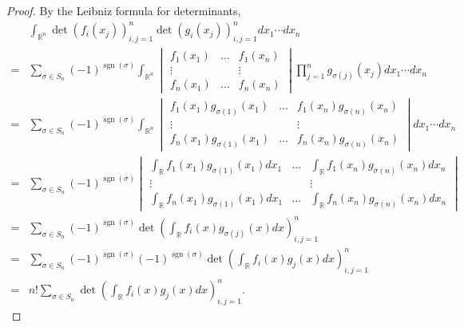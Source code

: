 \documentclass[11pt, a4paper]{article}
\numberwithin{equation}{section}
\newcommand{\realR}{\mathbb{R}}
\DeclareMathOperator{\sgn}{sgn}
\theoremstyle{definition}
\theoremstyle{remark}
\begin{document}
\begin{proof}
  By the Leibniz formula for determinants,
  \begin{equation}
    \begin{split}
      {}& \int_{\realR^n} \det(f_i(x_j))^n_{i, j = 1} \det(g_i(x_j))^n_{i, j = 1} dx_1 \dotsm dx_n \\
      = {}& \sum_{\sigma \in S_n} (-1)^{\sgn(\sigma)} \int_{\realR^n}
      \begin{vmatrix}
        f_1(x_1) & \dots & f_1(x_n) \\
        \vdots & & \vdots \\
        f_n(x_1) & \dots & f_n(x_n) 
      \end{vmatrix}
      \prod^n_{j = 1} g_{\sigma(j)}(x_j) dx_1 \dotsm dx_n \\
      = {}& \sum_{\sigma \in S_n} (-1)^{\sgn(\sigma)} \int_{\realR^n}
      \begin{vmatrix}
        f_1(x_1) g_{\sigma(1)}(x_1) & \dots & f_1(x_n) g_{\sigma(n)}(x_n) \\
        \vdots & & \vdots \\
        f_n(x_1) g_{\sigma(1)}(x_1) & \dots & f_n(x_n) g_{\sigma(n)}(x_n)
      \end{vmatrix}
      dx_1 \dotsm dx_n \\
      = {}& \sum_{\sigma \in S_n} (-1)^{\sgn(\sigma)}
      \begin{vmatrix}
        \int_{\realR} f_1(x_1) g_{\sigma(1)}(x_1) dx_1 & \dots & \int_{\realR} f_1(x_n) g_{\sigma(n)}(x_n) dx_n \\
        \vdots & & \vdots \\
        \int_{\realR} f_n(x_1) g_{\sigma(1)}(x_1) dx_1 & \dots & \int_{\realR} f_n(x_n) g_{\sigma(n)}(x_n) dx_n
      \end{vmatrix} \\
      = {}& \sum_{\sigma \in S_n} (-1)^{\sgn(\sigma)} \det \left( \int_{\realR} f_i(x) g_{\sigma(j)}(x) dx \right)^n_{i, j = 1} \\
      = {}& \sum_{\sigma \in S_n} (-1)^{\sgn(\sigma)} (-1)^{\sgn(\sigma)} \det \left( \int_{\realR} f_i(x) g_j(x) dx \right)^n_{i, j = 1} \\
      = {}& n! \sum_{\sigma \in S_n} \det \left( \int_{\realR} f_i(x) g_j(x) dx \right)^n_{i, j = 1}.
    \end{split}
  \end{equation}
\end{proof}
\end{document}
